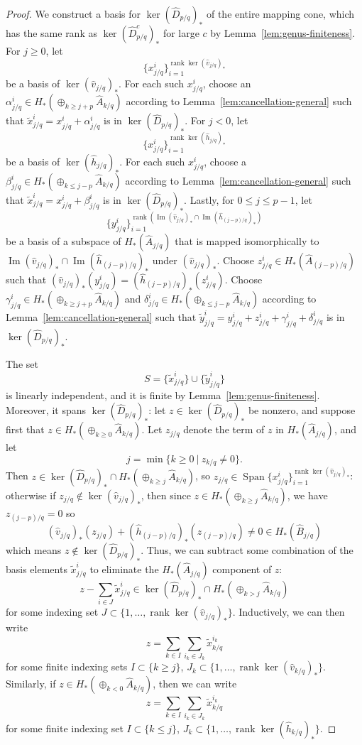\documentclass{article}
\theoremstyle{remark}
\numberwithin{equation}{section}
\numberwithin{table}{section}
\newcommand{\wt}{\widetilde}
\newcommand{\wh}{\widehat}
\DeclareMathOperator{\im}{Im}
\DeclareMathOperator{\Span}{Span}
\DeclareMathOperator{\rank}{rank}
\renewcommand{\(}{\left(}
\renewcommand{\)}{\right)}
\begin{document}
\begin{proof}
We construct a basis for $\ker(\wh D_{p/q})_*$ of the entire mapping cone, which has the same rank as $\ker(\wh D_{p/q}^c)_*$ for large $c$ by Lemma~\ref{lem:genus-finiteness}. For $j\ge 0$, let
$$\{ x_{j/q}^i\}_{i=1}^{\rank\ker(\wh v_{j/q})_*}$$
be a basis of $\ker(\wh v_{j/q})_*$. For each such $x_{j/q}^i$, choose an $\alpha_{j/q}^i\in H_*(\oplus_{k\ge j+p}\wh A_{k/q})$ according to Lemma~\ref{lem:cancellation-general} such that $\wt x_{j/q}^i=x_{j/q}^i+\alpha_{j/q}^i$ is in $\ker(\wh D_{p/q})_*$. For $j<0$, let 
$$\{x_{j/q}^i\}_{i=1}^{\rank\ker(\wh h_{j/q})_*}$$ 
be a basis of $\ker(\wh h_{j/q})_*$. For each such $x_{j/q}^i$, choose a $\beta_{j/q}^i\in H_*(\oplus_{k\le j-p}\wh A_{k/q})$ according to Lemma~\ref{lem:cancellation-general} such that $\wt x_{j/q}^i=x_{j/q}^i+\beta_{j/q}^i$ is in $\ker(\wh D_{p/q})_*$. Lastly, for $0\le j\le p-1$, let 
$$\{y_{j/q}^i\}_{i=1}^{\rank\left(\im(\wh v_{j/q})_* \cap \im(\wh h_{(j-p)/q})_*\right)}$$
be a basis of a subspace of $H_*(\wh A_{j/q})$ that is mapped isomorphically to $\im(\wh v_{j/q})_* \cap \im(\wh h_{(j-p)/q})_*$ under $(\wh v_{j/q})_*$. Choose $z_{j/q}^i\in H_*(\wh A_{(j-p)/q})$ such that $(\wh v_{j/q})_*(y_{j/q}^i)=(\wh h_{(j-p)/q})_*(z_{j/q}^i)$. Choose $\gamma_{j/q}^i\in H_*(\oplus_{k\ge j+p}\wh A_{k/q})$ and $\delta_{j/q}^i\in H_*(\oplus_{k\le j-p}\wh A_{k/q})$ according to Lemma~\ref{lem:cancellation-general} such that $\wt y_{j/q}^i=y_{j/q}^i+z_{j/q}^i+\gamma_{j/q}^i+\delta_{j/q}^i$ is in $\ker(\wh D_{p/q})_*$.

The set $$S=\{\wt x_{j/q}^i\}\cup\{\wt y_{j/q}^i\}$$ is linearly independent, and it is finite by Lemma~\ref{lem:genus-finiteness}. Moreover, it spans $\ker(\wh D_{p/q})_*$: let $z\in\ker(\wh D_{p/q})_*$ be nonzero, and suppose first that $z\in H_*(\oplus_{k\ge 0}\wh A_{k/q})$. Let $z_{j/q}$ denote the term of $z$ in $H_*(\wh A_{j/q})$, and let
$$j=\min\{k\ge 0\ \vert\ z_{k/q}\ne 0\}.$$ Then $z\in\ker(\wh D_{p/q})_*\cap H_*(\oplus_{k\ge j}\wh A_{k/q})$, so $z_{j/q}\in\Span \{x_{j/q}^i\}_{i=1}^{\rank\ker(\wh v_{j/q})_*}$: otherwise if $z_{j/q}\notin\ker(\wh v_{j/q})_*$, then since $z\in H_*(\oplus_{k\ge j}\wh A_{k/q})$, we have $z_{(j-p)/q}=0$ so $$(\wh v_{j/q})_*(z_{j/q})+(\wh h_{(j-p)/q})_*(z_{(j-p)/q})\ne 0\in H_*(\wh B_{j/q})$$ which means $z\notin\ker(\wh D_{p/q})_*$. Thus, we can subtract some combination of the basis elements $\wt x_{j/q}^i$ to eliminate the $H_*(\wh A_{j/q})$ component of $z$:
$$z-\sum_{i\in J}\wt x_{j/q}^i\in\ker(\wh D_{p/q})_*\cap H_*(\oplus_{k>j}\wh A_{k/q})$$ for some indexing set $J\subset\{1,\dots,\rank\ker(\wh v_{j/q})_*\}$. Inductively, we can then write 
$$z=\sum_{k\in I}\sum_{i_k\in J_k}\wt x_{k/q}^{i_k}$$ for some finite indexing sets $I\subset\{k\ge j\}$, $J_k\subset\{1,\dots,\rank\ker(\wh v_{k/q})_*\}$. Similarly, if $z\in H_*(\oplus_{k<0}\wh A_{k/q})$, then we can write
$$z=\sum_{k\in I}\sum_{i_k\in J_k}\wt x_{k/q}^{i_k}$$ for some finite indexing set $I\subset\{k\le j\}$, $J_k\subset\{1,\dots,\rank\ker(\wh h_{k/q})_*\}$.


\end{proof}
\end{document}
